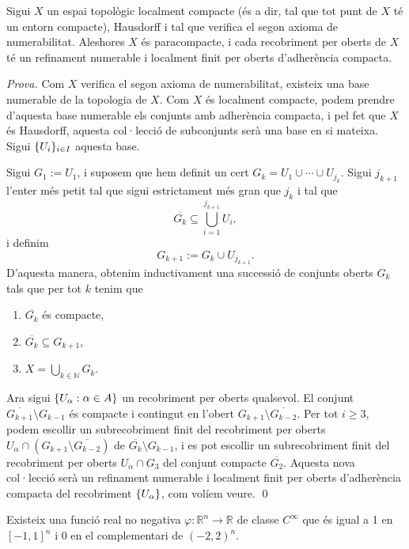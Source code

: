 \begin{lema}\label{lema:paracompact}
    Sigui $X$ un espai topològic localment compacte (és a dir, tal que tot punt de $X$ té un entorn compacte), Hausdorff i tal que verifica el segon axioma de numerabilitat. Aleshores $X$ és paracompacte, i cada recobriment per oberts de $X$ té un refinament numerable i localment finit per oberts d'adherència compacta.
\end{lema}
{\color{black} 
    \textit{Prova.} 
    Com $X$ verifica el segon axioma de numerabilitat, existeix una base numerable de la topologia de $X$. Com $X$ és localment compacte, podem prendre d'aquesta base numerable els conjunts amb adherència compacta, i pel fet que $X$ és Hausdorff, aquesta col·lecció de subconjunts serà una base en si mateixa. Sigui $\{U_i\}_{i\in I}$ aquesta base.

    Sigui $G_1 := U_1$, i suposem que hem definit un cert $G_k=U_1\cup\cdots\cup U_{j_k}$. Sigui $j_{k+1}$ l'enter més petit tal que sigui estrictament més gran que $j_k$ i tal que 
    \begin{equation*}
        \overline{G_k}\subseteq \bigcup_{i = 1}^{j_{k+1}} U_i,
    \end{equation*}
    i definim 
    \begin{equation*}
        G_{k+1} := G_k\cup U_{j_{k+1}}.
    \end{equation*}
    D'aquesta manera, obtenim inductivament una successió de conjunts oberts $G_k$ tals que per tot $k$ tenim que
    \begin{enumerate}
        \item $\overline{G_k}$ és compacte,
        \item $\overline{G_k}\subseteq G_{k+1}$,
        \item $X = \bigcup_{k\in\mathbb N} G_k$.
    \end{enumerate}
    Ara sigui $\{U_\alpha:\alpha\in A\}$ un recobriment per oberts qualsevol. El conjunt $\overline{G_{k+1}}\setminus G_{k-1}$ és compacte i contingut en l'obert $G_{k+1}\setminus \overline{G_{k-2}}$. Per tot $i\ge3$, podem escollir un subrecobriment finit del recobriment per oberts $U_\alpha\cap(G_{k+1}\setminus \overline{G_{k-2}})$ de $\overline{G_k}\setminus G_{k-1}$, i es pot escollir un subrecobriment finit del recobriment per oberts $U_\alpha\cap G_3$ del conjunt compacte $\overline{G_2}$. Aquesta nova col·lecció serà un refinament numerable i localment finit per oberts d'adherència compacta del recobriment $\{U_\alpha\}$, com volíem veure. \qed
}
\begin{lema}\label{lema:bump}
    Existeix una funció real no negativa $\varphi:\mathbb R^n\to\mathbb R$ de classe $C^\infty$ que és igual a 1 en $[-1,1]^n$ i $0$ en el complementari de $(-2,2)^n$.
\end{lema}

